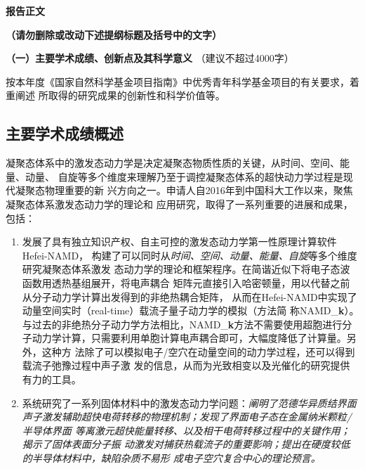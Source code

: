 \documentclass[12pt,UTF8,AutoFakeBold=3,a4paper]{article}
\newcommand{\sanhao}{\fontsize{16pt}{\baselineskip}\selectfont}
\newcommand{\sihao}{\fontsize{14pt}{\baselineskip}\selectfont}
\newcommand{\namdk}{NAMD\_{\bf k}}
\newcommand{\hnamd}{Hefei-NAMD}
\begin{document}

\begin{center}
 \kaishu{} \bfseries{} \sanhao{} 报告正文
\end{center}

{\kaishu{}\bfseries{}\sihao{}
  \textcolor{NsfcBlue}
  {（请勿删除或改动下述提纲标题及括号中的文字）}
}

{\kaishu{}\sihao{}
  \textcolor{NsfcBlue}
  {\bfseries{}（一）主要学术成绩、创新点及其科学意义}
  \color{NsfcBlue}（建议不超过4000字）
}

{\kaishu{}\sihao{}
  \textcolor{NsfcBlue}{
  按本年度《国家自然科学基金项目指南》中优秀青年科学基金项目的有关要求，着重阐述
  所取得的研究成果的创新性和科学价值等。
}}%
\vspace{-20pt}
\subsection*{主要学术成绩概述}

凝聚态体系中的激发态动力学是决定凝聚态物质性质的关键，从时间、空间、能量、动量、
自旋等多个维度来理解乃至于调控凝聚态体系的超快动力学过程是现代凝聚态物理重要的新
兴方向之一。申请人自{\large{}2016}年到中国科大工作以来，聚焦凝聚态体系激发态动力学的理论和
应用研究，取得了一系列重要的进展和成果，包括：

\begin{enumerate}
[
  leftmargin=15pt
]
  
\item 发展了具有独立知识产权、自主可控的激发态动力学第一性原理计算软件Hefei-NAMD，
  构建了可以同时从\emph{时间、空间、动量、能量、自旋}等多个维度研究凝聚态体系激发
  态动力学的理论和框架程序。在简谐近似下将电子态波函数用透热基组展开，将电声耦合
  矩阵元直接引入哈密顿量，用以代替之前从分子动力学计算出发得到的非绝热耦合矩阵，
  从而在\hnamd{}中实现了动量空间实时（real-time）载流子量子动力学的模拟（方法简
  称\namdk{}）。与过去的非绝热分子动力学方法相比，\namdk{}方法不需要使用超胞进行分
  子动力学计算，只需要利用单胞计算电声耦合即可，大幅度降低了计算量。另外，这种方
  法除了可以模拟电子/空穴在动量空间的动力学过程，还可以得到载流子弛豫过程中声子激
  发的信息，从而为光致相变以及光催化的研究提供有力的工具。
  

\item 系统研究了一系列固体材料中的激发态动力学问题：\emph{阐明了范德华异质结界面
    声子激发辅助超快电荷转移的物理机制；发现了界面电子态在金属纳米颗粒/半导体界面
    等离激元超快能量转移、以及相干电荷转移过程中的关键作用；揭示了固体表面分子振
    动激发对捕获热载流子的重要影响；提出在硬度较低的半导体材料中，缺陷杂质不易形
    成电子空穴复合中心的理论预言。}
\end{enumerate}
\end{document}

